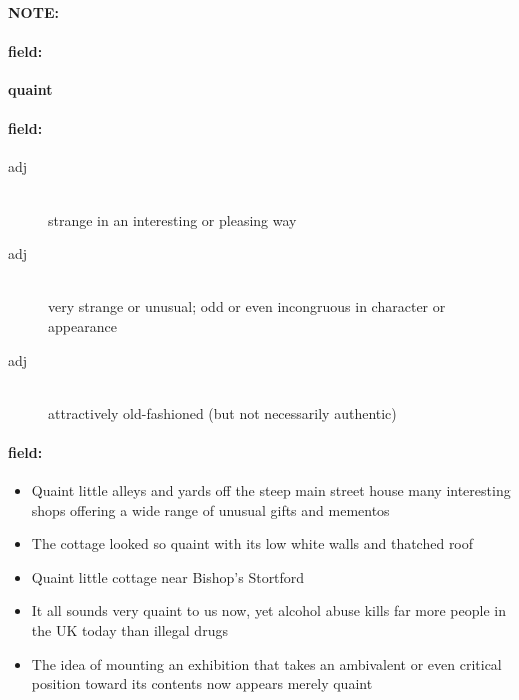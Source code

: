 \documentclass[12pt]{article}
\newenvironment{note}{\paragraph{NOTE:}}{}
\newenvironment{field}{\paragraph{field:}}{}
\begin{document}
\begin{note}
\begin{field}
\textbf{\large quaint}
\end{field}


\begin{field}
\begin{description}
\item[adj] \hfill \\ 
strange in an interesting or pleasing way

\item[adj] \hfill \\ 
very strange or unusual; odd or even incongruous in character or appearance

\item[adj] \hfill \\ 
attractively old-fashioned (but not necessarily authentic)

\end{description}
\end{field}

\begin{field}
\begin{itemize}
\item Quaint little alleys and yards off the steep main street house many interesting shops offering a wide range of unusual gifts and mementos
\item The cottage looked so quaint with its low white walls and thatched roof
\item Quaint little cottage near Bishop's Stortford
\item It all sounds very quaint to us now, yet alcohol abuse kills far more people in the UK today than illegal drugs
\item The idea of mounting an exhibition that takes an ambivalent or even critical position toward its contents now appears merely quaint
\end{itemize}
\end{field}
\end{note}
\end{document}
